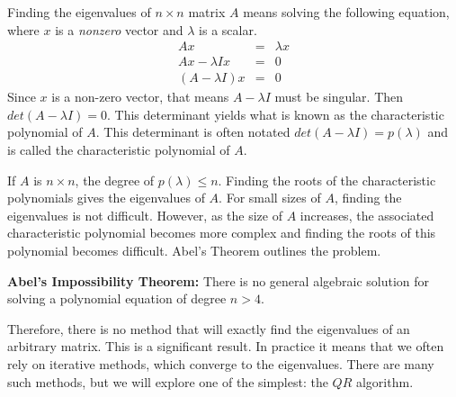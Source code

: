 \label{Ch:EigSolve}


Finding the eigenvalues of $n \times n$ matrix $A$ means solving the following equation, where $x$ is a \emph{nonzero} vector and $\lambda$ is a scalar.
\begin{eqnarray}
 A x                       &=& \lambda x \\
A x - \lambda I x &=& 0 \\
(A - \lambda I)x &=& 0
\end{eqnarray}
Since $x$ is a non-zero vector, that means $A-\lambda I$ must be singular. Then $det(A-\lambda I) = 0$.  This determinant yields what is known as the characteristic polynomial of $A$. This determinant is often notated $det(A-\lambda I) = p(\lambda)$ and is called the characteristic polynomial of $A$.

If $A$ is $n \times n$, the degree of $p(\lambda) \leq n$.  Finding the roots of the characteristic polynomials gives the eigenvalues of $A$.  For small sizes of $A$, finding the eigenvalues is not difficult.  However, as the size of $A$ increases, the associated characteristic polynomial becomes more complex and finding the roots of this polynomial becomes difficult.  Abel's Theorem  outlines the problem.

\begin{theorem}
\label{Theorem:Abel}
{\bf Abel's Impossibility Theorem:} There is no general algebraic solution for solving a polynomial equation of degree $n>4$.
\end{theorem}

Therefore, there is no method that will exactly find the eigenvalues of an arbitrary matrix. This is a significant result. In practice it means that we often rely on iterative methods, which converge to the eigenvalues. There are many such methods, but we will explore one of the simplest: the $QR$ algorithm.

